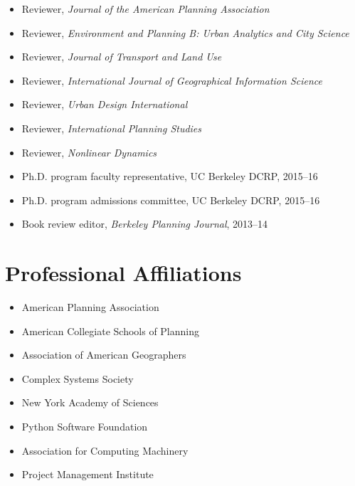 \documentclass{academiccv}
\begin{document}
\begin{itemize}

\item Reviewer, \textit{Journal of the American Planning Association}

\item Reviewer, \textit{Environment and Planning B: Urban Analytics and City Science}

\item Reviewer, \textit{Journal of Transport and Land Use}

\item Reviewer, \textit{International Journal of Geographical Information Science}

\item Reviewer, \textit{Urban Design International}

\item Reviewer, \textit{International Planning Studies}

\item Reviewer, \textit{Nonlinear Dynamics}

\item Ph.D. program faculty representative, UC Berkeley DCRP, 2015--16

\item Ph.D. program admissions committee, UC Berkeley DCRP, 2015--16

\item Book review editor, \textit{Berkeley Planning Journal}, 2013--14

\end{itemize}



\section*{Professional Affiliations}

\begin{itemize}
	
\item American Planning Association

\item American Collegiate Schools of Planning

\item Association of American Geographers

\item Complex Systems Society

\item New York Academy of Sciences

\item Python Software Foundation

\item Association for Computing Machinery

\item Project Management Institute

\end{itemize}
\end{document}
